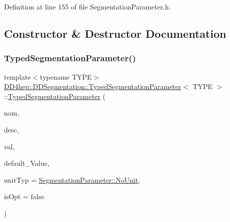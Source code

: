 Definition at line 155 of file Segmentation\+Parameter.\+h.



\subsection{Constructor \& Destructor Documentation}
\hypertarget{class_d_d4hep_1_1_d_d_segmentation_1_1_typed_segmentation_parameter_a59c2507c03ce750d64a5800bdc0f531b}{}\label{class_d_d4hep_1_1_d_d_segmentation_1_1_typed_segmentation_parameter_a59c2507c03ce750d64a5800bdc0f531b} 
\subsubsection{\texorpdfstring{Typed\+Segmentation\+Parameter()}{TypedSegmentationParameter()}}
{\footnotesize\ttfamily template$<$typename T\+Y\+PE$>$ \\
\hyperlink{class_d_d4hep_1_1_d_d_segmentation_1_1_typed_segmentation_parameter}{D\+D4hep\+::\+D\+D\+Segmentation\+::\+Typed\+Segmentation\+Parameter}$<$ T\+Y\+PE $>$\+::\hyperlink{class_d_d4hep_1_1_d_d_segmentation_1_1_typed_segmentation_parameter}{Typed\+Segmentation\+Parameter} (\begin{DoxyParamCaption}\item[{const std\+::string \&}]{nam,  }\item[{const std\+::string \&}]{desc,  }\item[{T\+Y\+PE \&}]{val,  }\item[{const T\+Y\+PE \&}]{default\+\_\+\+Value,  }\item[{\hyperlink{class_d_d4hep_1_1_d_d_segmentation_1_1_segmentation_parameter_a36f5f8b8d812b2a2b81363377565d8d4}{Segmentation\+Parameter\+::\+Unit\+Type}}]{unit\+Typ = {\ttfamily \hyperlink{class_d_d4hep_1_1_d_d_segmentation_1_1_segmentation_parameter_a36f5f8b8d812b2a2b81363377565d8d4ab217a538e0ac077135786260a2221c14}{Segmentation\+Parameter\+::\+No\+Unit}},  }\item[{bool}]{is\+Opt = {\ttfamily false} }\end{DoxyParamCaption})\hspace{0.3cm}{\ttfamily [inline]}}



